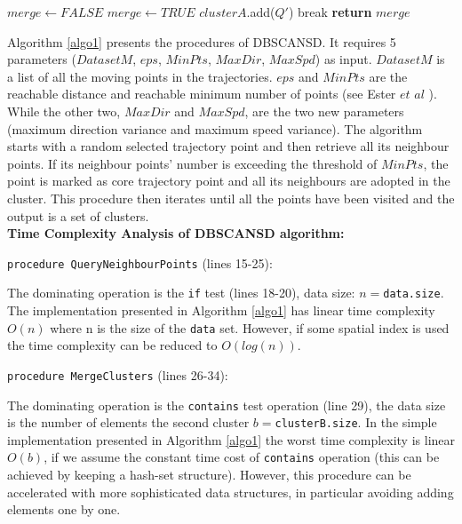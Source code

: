 \documentclass[12pt,glossary]{dalcsthesis}
\begin{document}
\begin{algorithm}
\begin{algorithmic}[1]

\State $merge \gets FALSE$
{}
        \State $merge \gets TRUE$
            \State $clusterA$.add($Q'$)
        \EndFor
    \State break
    \EndIf
\EndFor
\State \textbf{return} $merge$
\EndProcedure


\end{algorithmic}
\end{algorithm}





Algorithm \ref{algo1} presents the procedures of DBSCANSD. It requires 5 parameters ($DatasetM$, $eps$, $MinPts$, $MaxDir$, $MaxSpd$) as input. $DatasetM$ is a list of all the moving points in the trajectories.  $eps$ and $MinPts$ are the reachable distance and reachable minimum number of points (see Ester $et$ $al$ \cite{DBScan96}). While the other two, $MaxDir$ and $MaxSpd$, are the two new parameters (maximum direction variance and maximum speed variance).  The algorithm starts with a random selected trajectory point and then retrieve all its neighbour points. If its neighbour points' number is exceeding the threshold of $MinPts$, the point is marked as core trajectory point and all its neighbours are adopted in the cluster. This procedure then iterates until all the points have been visited and the output is a set of clusters. \\



\noindent\textbf{Time Complexity Analysis of DBSCANSD algorithm:}

\noindent\texttt{procedure QueryNeighbourPoints} (lines 15-25):

\noindent The dominating operation is the \texttt{if} test (lines 18-20), data size: $n=$\texttt{data.size}.
The implementation presented in Algorithm \ref{algo1} has linear time complexity $O(n)$ where n is the size of the \texttt{data} set. However, if some spatial index is used the time complexity can be reduced to $O(log(n))$.


\noindent\texttt{procedure MergeClusters} (lines 26-34):

\noindent The dominating operation is the \texttt{contains} test operation (line 29), the data size is the number of elements the second cluster $b=$\texttt{clusterB.size}.
In the simple implementation presented in Algorithm \ref{algo1} the worst time complexity is linear $O(b)$, if we assume the constant time cost of \texttt{contains} operation (this can be achieved by keeping a hash-set structure). However, this procedure can be accelerated with more sophisticated data structures, in particular avoiding adding elements one by one.
\end{document}
